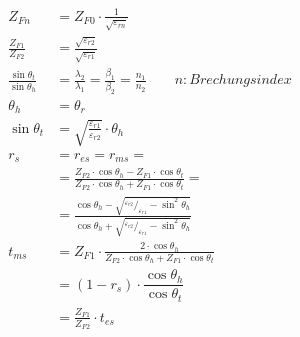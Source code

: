 \begin{align*}
    Z_{Fn}                            & = Z_{F0}\cdot\frac{1}{\sqrt{\varepsilon_{rn}}}                                                                                                                  \\
    \frac{Z_{F1}}{Z_{F2}}             & = \frac{\sqrt{\varepsilon_{r2}}}{\sqrt{\varepsilon_{r1}}}                                                                                                       \\
    \frac{\sin\theta_t}{\sin\theta_h} & = \frac{\lambda_2}{\lambda_1}= \frac{\beta_1}{\beta_2}= \frac{n_1}{n_2} \qquad n: Brechungsindex                                                                \\
    \theta_h                          & = \theta_r                                                                                                                                                      \\
    \sin\theta_t                      & = \sqrt{\frac{\varepsilon_{r1}}{\varepsilon_{r2}}}\cdot\theta_h                                                                                                 \\
    r_s                               & =  r_{e s} = r_{m s} =                                                                                                                                          \\
                                      & = \frac{Z_{F 2} \cdot \cos \theta_h-Z_{F 1} \cdot \cos \theta_t}{Z_{F 2} \cdot \cos \theta_h+Z_{F 1} \cdot \cos \theta_t} =                                     \\
                                      & = \frac{\cos\theta_h-\sqrt{^{\varepsilon_{r2}}/_{\varepsilon_{r1}}-\sin^2\theta_h}}{\cos\theta_h+\sqrt{^{\varepsilon_{r2}}/_{\varepsilon_{r1}}-\sin^2\theta_h}} \\
    t_{m s}                           & = Z_{F 1} \cdot \frac{2 \cdot \cos \theta_h}{Z_{F 2} \cdot \cos \theta_h+Z_{F 1} \cdot \cos \theta_t}                                                           \\
                                      & = (1 - r_{s}) \cdot \dfrac{\cos \theta_h}{\cos \theta_t}                                                                                                        \\
                                      & = \frac{Z_{F1}}{Z_{F2}}\cdot t_{es}                                                                                                                             \\

\end{align*}
